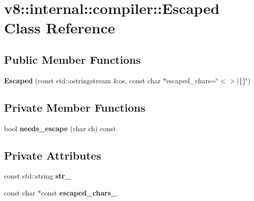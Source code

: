 \hypertarget{classv8_1_1internal_1_1compiler_1_1_escaped}{}\section{v8\+:\+:internal\+:\+:compiler\+:\+:Escaped Class Reference}
\label{classv8_1_1internal_1_1compiler_1_1_escaped}
\subsection*{Public Member Functions}
\begin{DoxyCompactItemize}
\item 
{\bfseries Escaped} (const std\+::ostringstream \&os, const char $\ast$escaped\+\_\+chars=\char`\"{}$<$$>$$\vert$\{\}\char`\"{})\hypertarget{classv8_1_1internal_1_1compiler_1_1_escaped_a1aad6110ef60d078f8d20cc274543136}{}\label{classv8_1_1internal_1_1compiler_1_1_escaped_a1aad6110ef60d078f8d20cc274543136}

\end{DoxyCompactItemize}
\subsection*{Private Member Functions}
\begin{DoxyCompactItemize}
\item 
bool {\bfseries needs\+\_\+escape} (char ch) const \hypertarget{classv8_1_1internal_1_1compiler_1_1_escaped_a53ff3cacd40caf515106462b0b3c37ba}{}\label{classv8_1_1internal_1_1compiler_1_1_escaped_a53ff3cacd40caf515106462b0b3c37ba}

\end{DoxyCompactItemize}
\subsection*{Private Attributes}
\begin{DoxyCompactItemize}
\item 
const std\+::string {\bfseries str\+\_\+}\hypertarget{classv8_1_1internal_1_1compiler_1_1_escaped_a48f50f22e850806e25ebb03fb7604bca}{}\label{classv8_1_1internal_1_1compiler_1_1_escaped_a48f50f22e850806e25ebb03fb7604bca}

\item 
const char $\ast$const {\bfseries escaped\+\_\+chars\+\_\+}\hypertarget{classv8_1_1internal_1_1compiler_1_1_escaped_ad0b2a4555ecc89b0ae47add48d461ad9}{}\label{classv8_1_1internal_1_1compiler_1_1_escaped_ad0b2a4555ecc89b0ae47add48d461ad9}

\end{DoxyCompactItemize}
